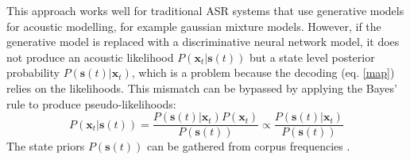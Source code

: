 \documentclass[11pt]{article}
\begin{document}
This approach works well for traditional ASR systems that use generative models for acoustic modelling, for example gaussian mixture models. However, if the generative model is replaced with a discriminative neural network model, it does not produce an acoustic likelihood $P(\boldsymbol{x}_t|\boldsymbol{s}(t))$ but a state level posterior probability $P(\boldsymbol{s}(t)|\boldsymbol{x}_t)$, which is a problem because the decoding (eq. \ref{map}) relies on the likelihoods. This mismatch can be bypassed by applying the Bayes' rule to produce pseudo-likelihoods:
\begin{equation}
    P(\boldsymbol{x}_t|\boldsymbol{s}(t)) =
    \frac{P(\boldsymbol{s}(t)|\boldsymbol{x}_t)P(\boldsymbol{x}_t)} {P(\boldsymbol{s}(t))} \propto	 
    \frac{P(\boldsymbol{s}(t)|\boldsymbol{x}_t)} {P(\boldsymbol{s}(t))}
\end{equation}
The state priors $P(\boldsymbol{s}(t))$ can be gathered from corpus frequencies \citep{Bourlard1994}. 
\end{document}

